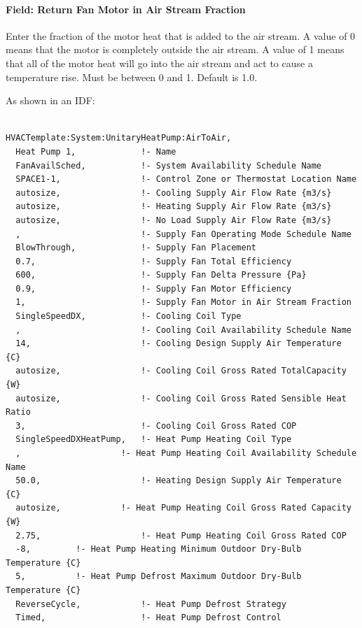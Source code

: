 \paragraph{Field: Return Fan Motor in Air Stream Fraction}\label{field-return-fan-motor-in-air-stream-fraction-1}

Enter the fraction of the motor heat that is added to the air stream. A value of 0 means that the motor is completely outside the air stream. A value of 1 means that all of the motor heat will go into the air stream and act to cause a temperature rise. Must be between 0 and 1. Default is 1.0.

As shown in an IDF:

\begin{lstlisting}

HVACTemplate:System:UnitaryHeatPump:AirToAir,
  Heat Pump 1,             !- Name
  FanAvailSched,           !- System Availability Schedule Name
  SPACE1-1,                !- Control Zone or Thermostat Location Name
  autosize,                !- Cooling Supply Air Flow Rate {m3/s}
  autosize,                !- Heating Supply Air Flow Rate {m3/s}
  autosize,                !- No Load Supply Air Flow Rate {m3/s}
  ,                        !- Supply Fan Operating Mode Schedule Name
  BlowThrough,             !- Supply Fan Placement
  0.7,                     !- Supply Fan Total Efficiency
  600,                     !- Supply Fan Delta Pressure {Pa}
  0.9,                     !- Supply Fan Motor Efficiency
  1,                       !- Supply Fan Motor in Air Stream Fraction
  SingleSpeedDX,           !- Cooling Coil Type
  ,                        !- Cooling Coil Availability Schedule Name
  14,                      !- Cooling Design Supply Air Temperature {C}
  autosize,                !- Cooling Coil Gross Rated TotalCapacity {W}
  autosize,                !- Cooling Coil Gross Rated Sensible Heat Ratio
  3,                       !- Cooling Coil Gross Rated COP
  SingleSpeedDXHeatPump,   !- Heat Pump Heating Coil Type
  ,                    !- Heat Pump Heating Coil Availability Schedule Name
  50.0,                    !- Heating Design Supply Air Temperature {C}
  autosize,            !- Heat Pump Heating Coil Gross Rated Capacity {W}
  2.75,                    !- Heat Pump Heating Coil Gross Rated COP
  -8,         !- Heat Pump Heating Minimum Outdoor Dry-Bulb Temperature {C}
  5,          !- Heat Pump Defrost Maximum Outdoor Dry-Bulb Temperature {C}
  ReverseCycle,            !- Heat Pump Defrost Strategy
  Timed,                   !- Heat Pump Defrost Control

\end{lstlisting}

